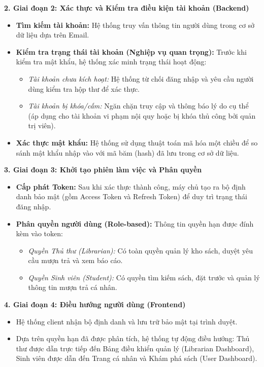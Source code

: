 \noindent\textbf{2. Giai đoạn 2: Xác thực và Kiểm tra điều kiện tài khoản (Backend)}
\begin{itemize}
    \item \textbf{Tìm kiếm tài khoản:} Hệ thống truy vấn thông tin người dùng trong cơ sở dữ liệu dựa trên Email.
    \item \textbf{Kiểm tra trạng thái tài khoản (Nghiệp vụ quan trọng):} Trước khi kiểm tra mật khẩu, hệ thống xác minh trạng thái hoạt động:
    \begin{itemize}
        \item \textit{Tài khoản chưa kích hoạt:} Hệ thống từ chối đăng nhập và yêu cầu người dùng kiểm tra hộp thư để xác thực.
        \item \textit{Tài khoản bị khóa/cấm:} Ngăn chặn truy cập và thông báo lý do cụ thể (áp dụng cho tài khoản vi phạm nội quy hoặc bị khóa thủ công bởi quản trị viên).
    \end{itemize}
    \item \textbf{Xác thực mật khẩu:} Hệ thống sử dụng thuật toán mã hóa một chiều để so sánh mật khẩu nhập vào với mã băm (hash) đã lưu trong cơ sở dữ liệu.
\end{itemize}

\noindent\textbf{3. Giai đoạn 3: Khởi tạo phiên làm việc và Phân quyền}
\begin{itemize}
    \item \textbf{Cấp phát Token:} Sau khi xác thực thành công, máy chủ tạo ra bộ định danh bảo mật (gồm Access Token và Refresh Token) để duy trì trạng thái đăng nhập.
    \item \textbf{Phân quyền người dùng (Role-based):} Thông tin quyền hạn được đính kèm vào token:
    \begin{itemize}
        \item \textit{Quyền Thủ thư (Librarian):} Có toàn quyền quản lý kho sách, duyệt yêu cầu mượn trả và xem báo cáo.
        \item \textit{Quyền Sinh viên (Student):} Có quyền tìm kiếm sách, đặt trước và quản lý thông tin mượn trả cá nhân.
    \end{itemize}
\end{itemize}

\noindent\textbf{4. Giai đoạn 4: Điều hướng người dùng (Frontend)}
\begin{itemize}
    \item Hệ thống client nhận bộ định danh và lưu trữ bảo mật tại trình duyệt.
    \item Dựa trên quyền hạn đã được phân tích, hệ thống tự động điều hướng: Thủ thư được dẫn trực tiếp đến Bảng điều khiển quản lý (Librarian Dashboard), Sinh viên được dẫn đến Trang cá nhân và Khám phá sách (User Dashboard).
\end{itemize}

